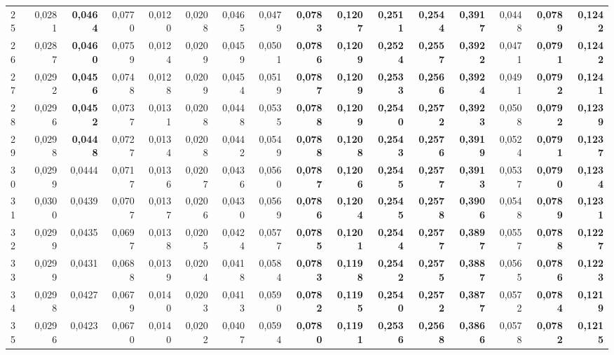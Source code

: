 \begin{table}[htp!]
\begin{adjustwidth}{-2cm}{}
\begin{tabular}{ l | *{15}{| r}}
25	&	0,0281	&	\textbf{0,0464}	&	0,0770	&	0,0120	&	0,0208	&	0,0465	&	0,0479	&	\textbf{0,0783}	&	\textbf{0,1207}	&	\textbf{0,2511}	&	\textbf{0,2544}	&	\textbf{0,3917}	&	0,0448	&	\textbf{0,0789}	&	\textbf{0,1242}	\\
26	&	0,0287	&	\textbf{0,0460}	&	0,0759	&	0,0124	&	0,0209	&	0,0459	&	0,0501	&	\textbf{0,0786}	&	\textbf{0,1209}	&	\textbf{0,2524}	&	\textbf{0,2557}	&	\textbf{0,3922}	&	0,0471	&	\textbf{0,0791}	&	\textbf{0,1242}	\\
27	&	0,0292	&	\textbf{0,0456}	&	0,0748	&	0,0128	&	0,0209	&	0,0454	&	0,0519	&	\textbf{0,0787}	&	\textbf{0,1209}	&	\textbf{0,2533}	&	\textbf{0,2566}	&	\textbf{0,3924}	&	0,0491	&	\textbf{0,0792}	&	\textbf{0,1241}	\\
28	&	0,0296	&	\textbf{0,0452}	&	0,0737	&	0,0131	&	0,0208	&	0,0448	&	0,0535	&	\textbf{0,0788}	&	\textbf{0,1209}	&	\textbf{0,2540}	&	\textbf{0,2572}	&	\textbf{0,3923}	&	0,0508	&	\textbf{0,0792}	&	\textbf{0,1239}	\\
29	&	0,0298	&	\textbf{0,0448}	&	0,0727	&	0,0134	&	0,0208	&	0,0442	&	0,0549	&	\textbf{0,0788}	&	\textbf{0,1208}	&	\textbf{0,2543}	&	\textbf{0,2576}	&	\textbf{0,3919}	&	0,0524	&	\textbf{0,0791}	&	\textbf{0,1237}	\\
30	&	0,0299	&	0,0444	&	0,0717	&	0,0136	&	0,0207	&	0,0436	&	0,0560	&	\textbf{0,0787}	&	\textbf{0,1206}	&	\textbf{0,2545}	&	\textbf{0,2577}	&	\textbf{0,3913}	&	0,0537	&	\textbf{0,0790}	&	\textbf{0,1234}	\\
31	&	0,0300	&	0,0439	&	0,0707	&	0,0137	&	0,0206	&	0,0430	&	0,0569	&	\textbf{0,0786}	&	\textbf{0,1204}	&	\textbf{0,2545}	&	\textbf{0,2578}	&	\textbf{0,3906}	&	0,0548	&	\textbf{0,0789}	&	\textbf{0,1231}	\\
32	&	0,0299	&	0,0435	&	0,0697	&	0,0138	&	0,0205	&	0,0424	&	0,0577	&	\textbf{0,0785}	&	\textbf{0,1201}	&	\textbf{0,2544}	&	\textbf{0,2577}	&	\textbf{0,3897}	&	0,0557	&	\textbf{0,0788}	&	\textbf{0,1227}	\\
33	&	0,0299	&	0,0431	&	0,0688	&	0,0139	&	0,0204	&	0,0418	&	0,0584	&	\textbf{0,0783}	&	\textbf{0,1198}	&	\textbf{0,2542}	&	\textbf{0,2575}	&	\textbf{0,3887}	&	0,0565	&	\textbf{0,0786}	&	\textbf{0,1223}	\\
34	&	0,0298	&	0,0427	&	0,0679	&	0,0140	&	0,0203	&	0,0413	&	0,0590	&	\textbf{0,0782}	&	\textbf{0,1195}	&	\textbf{0,2540}	&	\textbf{0,2572}	&	\textbf{0,3877}	&	0,0572	&	\textbf{0,0784}	&	\textbf{0,1219}	\\
35	&	0,0296	&	0,0423	&	0,0670	&	0,0140	&	0,0202	&	0,0407	&	0,0594	&	\textbf{0,0780}	&	\textbf{0,1191}	&	\textbf{0,2536}	&	\textbf{0,2568}	&	\textbf{0,3866}	&	0,0578	&	\textbf{0,0782}	&	\textbf{0,1215}	\\

\end{tabular}
\end{adjustwidth}
\end{table}
